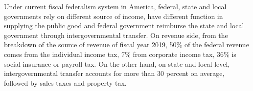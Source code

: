 Under current fiscal federalism system in America, federal, state and local governments rely on different source of income, have different function in supplying the public good and federal government reimburse the state and local government through intergovernmental transfer. On revenue side, from the breakdown of the source of revenue of fiscal year 2019, 50\% of the federal revenue comes from the individual income tax, 7\% from corporate income tax, 36\% is social insurance or payroll tax. On the other hand, on state and local level, intergovernmental transfer accounts for more than 30 percent on average, followed by sales taxes and property tax. 
\begin{figure}[H]
    \centering  %
\end{figure}
